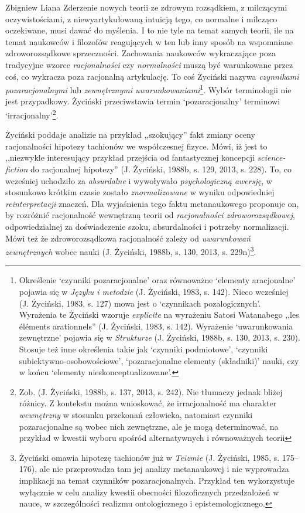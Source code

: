 \begin{artplenv}{Zbigniew Liana}
Zderzenie nowych teorii ze zdrowym rozsądkiem, z milczącymi oczywistościami, z niewyartykułowaną intuicją tego, co
normalne i milcząco oczekiwane, musi dawać do myślenia. I to nie tyle na temat samych teorii, ile na temat naukowców i filozofów
reagujących w ten lub inny sposób na wspomniane zdroworozsądkowe sprzeczności. Zachowania naukowców
wykraczające poza tradycyjne wzorce \textit{racjonalności} czy \textit{normalności} muszą być warunkowane przez coś, co
wykracza poza racjonalną artykulację. To coś Życiński nazywa \textit{czynnikami pozaracjonalnymi} lub \textit{zewnętrznymi
uwarunkowaniami}\footnote{Określenie `czynniki pozaracjonalne' oraz równoważne `elementy aracjonalne' pojawia
się w \textit{Języku i metodzie} \label{ref:RNDQuqexwGAtV}(J. Życiński, 1983, s. 142). Nieco wcześniej
\label{ref:RND8JMQ2LGnoG}(J. Życiński, 1983, s. 127) mowa jest o `czynnikach pozalogicznych'. Wyrażenia te Życiński
wzoruje \textit{explicite} na wyrażeniu Satosi Watanabego ,,les éléments arationnels'' \label{ref:RNDDibcJHr6Ng}(J.
Życiński, 1983, s. 142). Wyrażenie `uwarunkowania zewnętrzne' pojawia się w \textit{Strukturze}
\label{ref:RNDmQCXMWkgmK}(J. Życiński, 1988b, s. 130, 2013, s. 230). Stosuje też inne określenia takie jak `czynniki
podmiotowe', `czynniki subiektywno-osobowościowe', `pozaracjonalne elementy\textit{ }(składniki)' nauki, czy w końcu
`elementy nieskonceptualizowane'.}. Wybór terminologii nie jest przypadkowy. Życiński przeciwstawia termin
`pozaracjonalny' terminowi `irracjonalny'\footnote{Zob. \label{ref:RND4GDp5Hkb8p}(J. Życiński, 1988b, s. 137, 2013,
s. 242). Nie tłumaczy jednak bliżej różnicy. Z kontekstu można wnioskować, że irracjonalność ma charakter
\textit{wewnętrzny} w stosunku przekonań człowieka, natomiast czynniki pozaracjonalne są wobec nich zewnętrzne, ale je mogą determinować,
na przykład w kwestii wyboru spośród alternatywnych i równoważnych teorii}.

Życiński poddaje analizie na przykład ,,szokujący'' fakt zmiany oceny racjonalności hipotezy tachionów we współczesnej
fizyce. Mówi, iż jest to ,,niezwykle interesujący przykład przejścia od fantastycznej koncepcji \textit{science-fiction}
do racjonalnej hipotezy'' \label{ref:RNDOVbNCXy3az}(J. Życiński, 1988b, s. 129, 2013, s. 228). To, co wcześniej
uchodziło za \textit{absurdalne} i wywoływało \textit{psychologiczną awersję}, w stosunkowo krótkim czasie zostało
\textit{znormalizowane }w wyniku odpowiedniej \textit{reinterpretacji} znaczeń. Dla wyjaśnienia tego faktu metanaukowego
proponuje on, by rozróżnić racjonalność wewnętrzną teorii od \textit{racjonalności zdroworozsądkowej}, odpowiedzialnej za
doświadczenie szoku, absurdalności i potrzeby normalizacji. Mówi też że zdroworozsądkowa racjonalność zależy od
\textit{uwarunkowań zewnętrznych} wobec nauki \label{ref:RNDDERgYAAw4H}(J. Życiński, 1988b, s. 130, 2013,
s. 229n)\footnote{Życiński omawia hipotezę tachionów już w \textit{Teizmie} \label{ref:RNDGRaNeNBaa8}(J. Życiński, 1985,
s. 175–176), ale nie przeprowadza tam jej analizy metanaukowej i nie wyprowadza implikacji na temat czynników
pozaracjonalnych. Przykład ten wykorzystuje wyłącznie w celu analizy kwestii obecności filozoficznych
przedzałożeń w nauce, w szczególności realizmu ontologicznego i epistemologicznego.}.


\end{artplenv}
